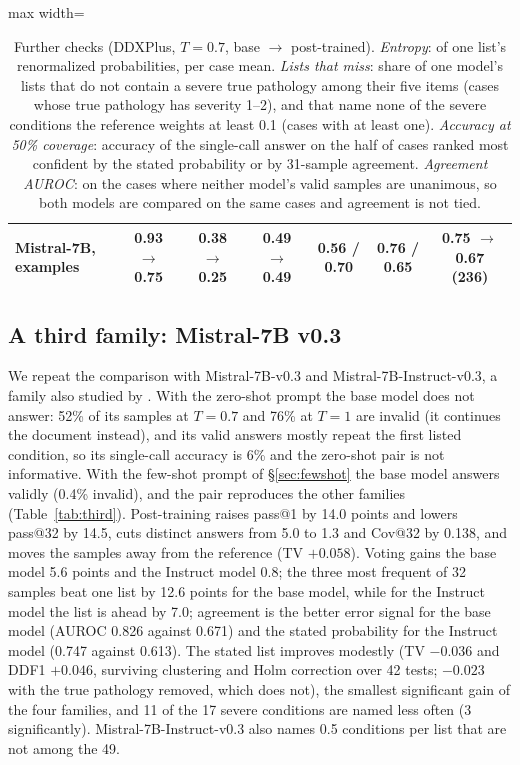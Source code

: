 \documentclass[wcp]{jmlr}
\begin{document}
\begin{table}[t]
\begin{adjustbox}{max width=\linewidth}
\begin{tabular}{lcccccc}
Mistral-7B, examples & 0.93 $\rightarrow$ 0.75 & 0.38 $\rightarrow$ 0.25 & 0.49 $\rightarrow$ 0.49 & 0.56 / 0.70 & 0.76 / 0.65 & 0.75 $\rightarrow$ 0.67 (236) \\
\bottomrule
\end{tabular}
\end{adjustbox}
\caption{Further checks (DDXPlus, $T{=}0.7$, base $\rightarrow$ post-trained). \emph{Entropy}: of one list's renormalized probabilities, per case mean. \emph{Lists that miss}: share of one model's lists that do not contain a severe true pathology among their five items (cases whose true pathology has severity 1--2), and that name none of the severe conditions the reference weights at least 0.1 (cases with at least one). \emph{Accuracy at 50\% coverage}: accuracy of the single-call answer on the half of cases ranked most confident by the stated probability or by 31-sample agreement. \emph{Agreement AUROC}: on the cases where neither model's valid samples are unanimous, so both models are compared on the same cases and agreement is not tied.}
\label{tab:r13pairs}
\end{table}

\subsection{A third family: Mistral-7B v0.3}\label{sec:mistral}
We repeat the comparison with Mistral-7B-v0.3 and Mistral-7B-Instruct-v0.3, a family also studied by \citet{jang2026cannotsample}. With the zero-shot prompt the base model does not answer: 52\% of its samples at $T{=}0.7$ and 76\% at $T{=}1$ are invalid (it continues the document instead), and its valid answers mostly repeat the first listed condition, so its single-call accuracy is 6\% and the zero-shot pair is not informative. With the few-shot prompt of \S\ref{sec:fewshot} the base model answers validly (0.4\% invalid), and the pair reproduces the other families (Table~\ref{tab:third}). Post-training raises pass@1 by 14.0 points and lowers pass@32 by 14.5, cuts distinct answers from 5.0 to 1.3 and Cov@32 by 0.138, and moves the samples away from the reference (TV $+0.058$). Voting gains the base model 5.6 points and the Instruct model 0.8; the three most frequent of 32 samples beat one list by 12.6 points for the base model, while for the Instruct model the list is ahead by 7.0; agreement is the better error signal for the base model (AUROC 0.826 against 0.671) and the stated probability for the Instruct model (0.747 against 0.613). The stated list improves modestly (TV $-0.036$ and DDF1 $+0.046$, surviving clustering and Holm correction over 42 tests; $-0.023$ with the true pathology removed, which does not), the smallest significant gain of the four families, and 11 of the 17 severe conditions are named less often (3 significantly). Mistral-7B-Instruct-v0.3 also names 0.5 conditions per list that are not among the 49.
\end{document}
